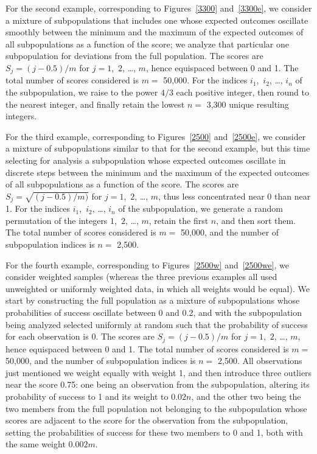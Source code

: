 \documentclass{article}
\begin{document}
For the second example, corresponding to Figures~\ref{3300} and~\ref{3300e},
we consider a mixture of subpopulations that includes one whose expected
outcomes oscillate smoothly between the minimum and the maximum of the
expected outcomes of all subpopulations as a function of the score; we analyze
that particular one subpopulation for deviations from the full population.
The scores are $S_j = (j - 0.5) / m$ for $j = 1$,~$2$, \dots, $m$,
hence equispaced between 0 and 1.
The total number of scores considered is $m =$ 50,000.
For the indices $i_1$,~$i_2$, \dots, $i_n$ of the subpopulation,
we raise to the power $4/3$ each positive integer,
then round to the nearest integer,
and finally retain the lowest $n =$ 3,300 unique resulting integers.

For the third example, corresponding to Figures~\ref{2500} and~\ref{2500e},
we consider a mixture of subpopulations similar to that for the second example,
but this time selecting for analysis a subpopulation
whose expected outcomes oscillate in discrete steps between the minimum
and the maximum of the expected outcomes of all subpopulations as a function
of the score.
The scores are $S_j = \sqrt{(j - 0.5) / m)}$ for $j = 1$,~$2$, \dots, $m$,
thus less concentrated near 0 than near 1.
For the indices $i_1$,~$i_2$, \dots, $i_n$ of the subpopulation,
we generate a random permutation of the integers $1$,~$2$, \dots, $m$,
retain the first $n$, and then sort them.
The total number of scores considered is $m =$ 50,000,
and the number of subpopulation indices is $n =$ 2,500.

For the fourth example, corresponding to Figures~\ref{2500w} and~\ref{2500we},
we consider weighted samples (whereas the three previous examples
all used unweighted or uniformly weighted data,
in which all weights would be equal).
We start by constructing the full population as a mixture of subpopulations
whose probabilities of success oscillate between 0 and 0.2,
and with the subpopulation being analyzed selected uniformly at random
such that the probability of success for each observation is 0.
The scores are $S_j = (j - 0.5) / m$ for $j = 1$,~$2$, \dots, $m$,
hence equispaced between 0 and 1.
The total number of scores considered is $m =$ 50,000,
and the number of subpopulation indices is $n =$ 2,500.
All observations just mentioned we weight equally with weight 1,
and then introduce three outliers near the score 0.75:
one being an observation from the subpopulation,
altering its probability of success to 1 and its weight to $0.02 n$,
and the other two being the two members from the full population
not belonging to the subpopulation whose scores are adjacent to the score
for the observation from the subpopulation, setting the probabilities
of success for these two members to 0 and 1,
both with the same weight $0.002 m$.
\end{document}
